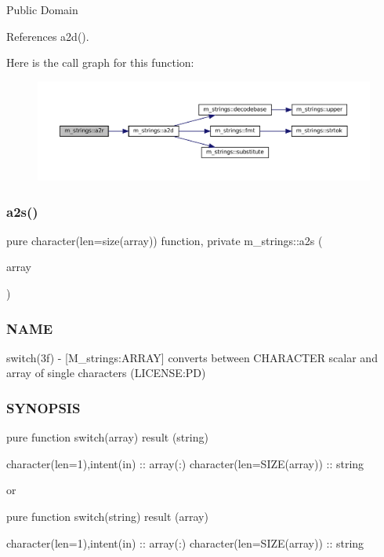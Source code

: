 Public Domain 

References a2d().

Here is the call graph for this function\+:\nopagebreak
\begin{figure}[H]
\begin{center}
\leavevmode
\includegraphics[width=350pt]{namespacem__strings_a6b4babf586dc3586426b13e4bb0fb979_cgraph}
\end{center}
\end{figure}
\mbox{\label{namespacem__strings_a9365ae5277199446d93fc5208be2e9a5}} 
\subsubsection{\texorpdfstring{a2s()}{a2s()}}
{\footnotesize\ttfamily pure character(len=size(array)) function, private m\+\_\+strings\+::a2s (\begin{DoxyParamCaption}\item[{character(len=1), dimension(\+:), intent(in)}]{array }\end{DoxyParamCaption})\hspace{0.3cm}{\ttfamily [private]}}



\subsubsection*{N\+A\+ME}

switch(3f) -\/ \mbox{[}M\+\_\+strings\+:A\+R\+R\+AY\mbox{]} converts between C\+H\+A\+R\+A\+C\+T\+ER scalar and array of single characters (L\+I\+C\+E\+N\+SE\+:PD)

\subsubsection*{S\+Y\+N\+O\+P\+S\+IS}

\begin{DoxyVerb}pure function switch(array) result (string)

 character(len=1),intent(in) :: array(:)
 character(len=SIZE(array))  :: string

  or

pure function switch(string) result (array)

 character(len=1),intent(in) :: array(:)
 character(len=SIZE(array))  :: string
\end{DoxyVerb}
